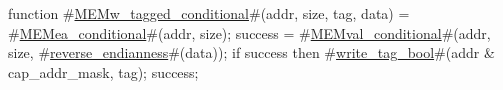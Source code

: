 function #\hyperref[sailMIPSzMEMwzytaggedzyconditional]{MEMw\_tagged\_conditional}#(addr, size, tag, data) =
{
  #\hyperref[sailMIPSzMEMeazyconditional]{MEMea\_conditional}#(addr, size);
  success = #\hyperref[sailMIPSzMEMvalzyconditional]{MEMval\_conditional}#(addr, size, #\hyperref[sailMIPSzreversezyendianness]{reverse\_endianness}#(data));
  if success then
     #\hyperref[sailMIPSzwritezytagzybool]{write\_tag\_bool}#(addr & cap_addr_mask, tag);
  success;
}
